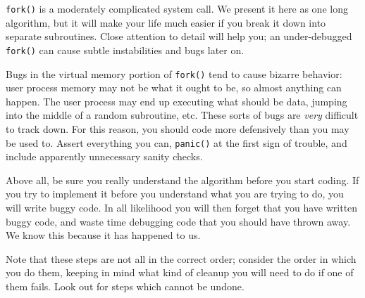 \texttt{fork()} is a moderately complicated system call. We present it here as one long algorithm, but it will make your life much easier if you break it down into separate subroutines. Close attention to detail will help you; an under-debugged \texttt{fork()} can cause subtle instabilities and bugs later on.

Bugs in the virtual memory portion of \texttt{fork()} tend to cause bizarre behavior: user process memory may not be what it ought to be, so almost anything can happen. The user process may end up executing what should be data, jumping into the middle of a random subroutine, etc. These sorts of bugs are \emph{very} difficult to track down. For this reason, you should code more defensively than you may be used to. Assert everything you can, \texttt{panic()} at the first sign of trouble, and include apparently unnecessary sanity checks.

Above all, be sure you really understand the algorithm before you start coding. If you try to implement it before you understand what you are trying to do, you will write buggy code. In all likelihood you will then forget that you have written buggy code, and waste time debugging code that you should have thrown away. We know this because it has happened to us.

Note that these steps are not all in the correct order; consider the order in which you do them, keeping in mind what kind of cleanup you will need to do if one of them fails. Look out for steps which cannot be undone.

